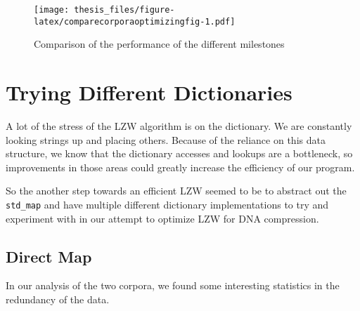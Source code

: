 \documentclass[12pt,twoside]{reedthesis}
\begin{document}
\begin{figure}
\centering
\texttt{[image: thesis\_files/figure-latex/comparecorporaoptimizingfig-1.pdf]}
\caption{\label{fig:comparecorporaoptimizingfig}Comparison of the performance of the different milestones}
\end{figure}
\hypertarget{trying-different-dictionaries}{%
\section{Trying Different Dictionaries}\label{trying-different-dictionaries}}

A lot of the stress of the LZW algorithm is on the dictionary. We are constantly looking strings up and placing others. Because of the reliance on this data structure, we know that the dictionary accesses and lookups are a bottleneck, so improvements in those areas could greatly increase the efficiency of our program.

So the another step towards an efficient LZW seemed to be to abstract out the \texttt{std\_map} and have multiple different dictionary implementations to try and experiment with in our attempt to optimize LZW for DNA compression.

\hypertarget{direct-map}{%
\subsection{Direct Map}\label{direct-map}}

In our analysis of the two corpora, we found some interesting statistics in the redundancy of the data.
\end{document}
